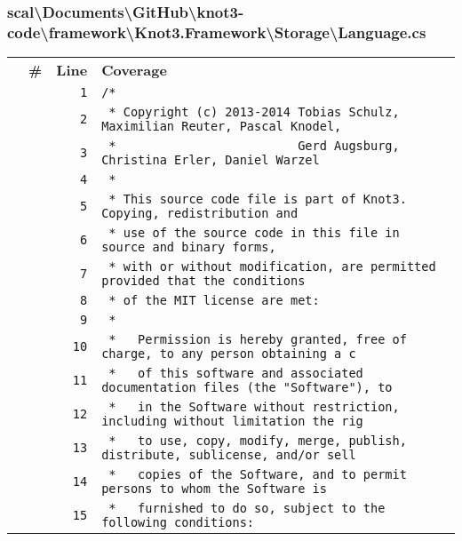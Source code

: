 \documentclass[a4paper,10pt]{article}
\begin{document}
\subsubsection{scal\textbackslash Documents\textbackslash GitHub\textbackslash knot3-code\textbackslash framework\textbackslash Knot3.Framework\textbackslash Storage\textbackslash Language.cs}
\begin{longtable}[l]{lrrl}
\textbf{} & \textbf{\#} & \textbf{Line} & \textbf{Coverage}\\
\cellcolor{gray} &  & \verb~1~ & \verb~/*~\\
\cellcolor{gray} &  & \verb~2~ & \verb~ * Copyright (c) 2013-2014 Tobias Schulz, Maximilian Reuter, Pascal Knodel,~\\
\cellcolor{gray} &  & \verb~3~ & \verb~ *                         Gerd Augsburg, Christina Erler, Daniel Warzel~\\
\cellcolor{gray} &  & \verb~4~ & \verb~ *~\\
\cellcolor{gray} &  & \verb~5~ & \verb~ * This source code file is part of Knot3. Copying, redistribution and~\\
\cellcolor{gray} &  & \verb~6~ & \verb~ * use of the source code in this file in source and binary forms,~\\
\cellcolor{gray} &  & \verb~7~ & \verb~ * with or without modification, are permitted provided that the conditions~\\
\cellcolor{gray} &  & \verb~8~ & \verb~ * of the MIT license are met:~\\
\cellcolor{gray} &  & \verb~9~ & \verb~ *~\\
\cellcolor{gray} &  & \verb~10~ & \verb~ *   Permission is hereby granted, free of charge, to any person obtaining a c~\\
\cellcolor{gray} &  & \verb~11~ & \verb~ *   of this software and associated documentation files (the "Software"), to ~\\
\cellcolor{gray} &  & \verb~12~ & \verb~ *   in the Software without restriction, including without limitation the rig~\\
\cellcolor{gray} &  & \verb~13~ & \verb~ *   to use, copy, modify, merge, publish, distribute, sublicense, and/or sell~\\
\cellcolor{gray} &  & \verb~14~ & \verb~ *   copies of the Software, and to permit persons to whom the Software is~\\
\cellcolor{gray} &  & \verb~15~ & \verb~ *   furnished to do so, subject to the following conditions:~\\

\end{longtable}
\end{document}
